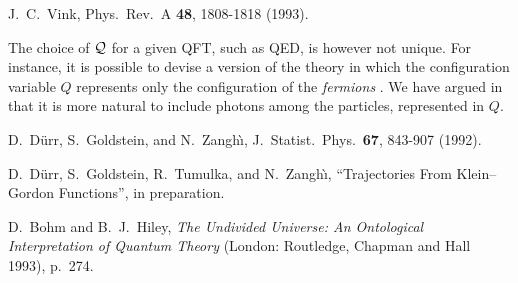 \documentclass[12pt, showpacs, nofootinbib,superscriptaddress]{revtex4-2}%
\begin{document}
\begin{thebibliography}{28.}
 J.~C.~Vink,
   Phys.\ Rev.\ A \textbf{48}, 1808-1818 (1993).

 The choice of $\mathcal{Q}$ for a given QFT, such as QED, is
however not unique. For instance, it is possible to devise a version
of the theory in which the configuration variable $Q$ represents only
the configuration of the \emph{fermions} \cite{BellBeables}.  We have
argued in \cite{crea1} that it is more natural to include photons
among the particles, represented in $Q$.

 D.~D\"urr, S.~Goldstein, and N.~Zangh{\`\i}, 
   J.\ Statist.\ Phys.\ \textbf{67}, 843-907 (1992).

 D.~D\"urr, S.~Goldstein, R.~Tumulka, and N.~Zangh{\`\i},
   ``Trajectories From Klein--Gordon Functions'', in preparation.

 D.~Bohm and B.~J.~Hiley, \textit{The Undivided Universe: An
   Ontological Interpretation of Quantum Theory} (London: Routledge,
   Chapman and Hall 1993), p.~274.











\end{thebibliography}
\end{document}

